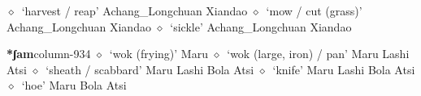          $\diamond$~`harvest / reap'
         Achang\_Longchuan 
\hspace{1ex}
         Xiandao 
\hspace{1ex}
         $\diamond$~`mow / cut (grass)'
         Achang\_Longchuan 
\hspace{1ex}
         Xiandao 
\hspace{1ex}
         $\diamond$~`sickle'
         Achang\_Longchuan 
\hspace{1ex}
         Xiandao 
  \item {\footnotesize \textbf{*ʃam}}{\tiny column-934}
         $\diamond$~`wok (frying)'
         Maru 
\hspace{1ex}
         $\diamond$~`wok (large, iron) / pan'
         Maru 
\hspace{1ex}
         Lashi 
\hspace{1ex}
         Atsi 
\hspace{1ex}
         $\diamond$~`sheath / scabbard'
         Maru 
\hspace{1ex}
         Lashi 
\hspace{1ex}
         Bola 
\hspace{1ex}
         Atsi 
\hspace{1ex}
         $\diamond$~`knife'
         Maru 
\hspace{1ex}
         Lashi 
\hspace{1ex}
         Bola 
\hspace{1ex}
         Atsi 
\hspace{1ex}
         $\diamond$~`hoe'
         Maru 
\hspace{1ex}
         Bola 
\hspace{1ex}
         Atsi 
